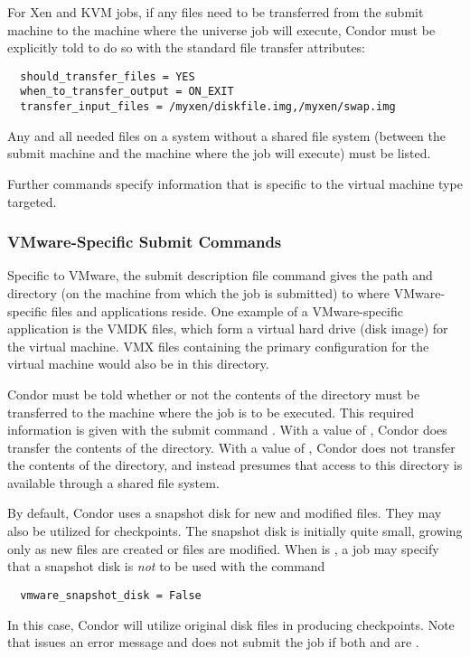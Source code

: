 For Xen and KVM jobs, if any files need to be transferred from the submit machine
to the machine where the  universe job will execute, 
Condor must be explicitly told to do so with the 
standard file transfer attributes:
\footnotesize
\begin{verbatim}
  should_transfer_files = YES
  when_to_transfer_output = ON_EXIT
  transfer_input_files = /myxen/diskfile.img,/myxen/swap.img
\end{verbatim}
\normalsize
Any and all needed files on a system without a shared file
system (between the submit machine and the machine where the
job will execute) must be listed.

Further commands specify information that is specific to the
virtual machine type targeted.

\subsubsection{\label{sec:vm-VMwaresubmitfile}VMware-Specific Submit Commands}

Specific to VMware, the submit description file command
 gives the path and directory
(on the machine from which the job is submitted)
to where VMware-specific files and applications reside.
One example of a VMware-specific application is the VMDK files,
which form a virtual hard drive (disk image) for the virtual machine.
VMX files containing the primary configuration for the virtual
machine would also be in this directory.

Condor must be told whether or not the contents of the 
directory must be transferred to the machine where the job is
to be executed.
This required information is given with the submit command
.
With a value of ,
Condor does transfer the contents of the directory.
With a value of ,
Condor does not transfer the contents of the directory,
and instead presumes that access to this directory is
available through a shared file system.

By default, Condor uses a snapshot disk for new and modified files.
They may also be utilized for checkpoints.
The snapshot disk is initially quite small,
growing only as new files are created or files are modified.
When  is ,
a job may specify that a snapshot disk is \emph{not} to be
used with the command
\begin{verbatim}
  vmware_snapshot_disk = False
\end{verbatim}
In this case, Condor will utilize original disk files in producing
checkpoints. 
Note that  issues an error message and does not
submit the job if both 
and  are .

